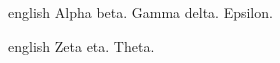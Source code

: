 \documentclass{article}
\begin{document}
\begin{mekor}
\begin{mekorlang}{english}
\pasuk[1]  Alpha \dilug beta.  Gamma \dilug delta.  Epsilon.
\end{mekorlang}
\end{mekor}
\begin{mekor}
\begin{mekorlang}{english}
\pasuk[1]  Zeta \dilug eta.  Theta.
\end{mekorlang}
\end{mekor}
\end{document}
